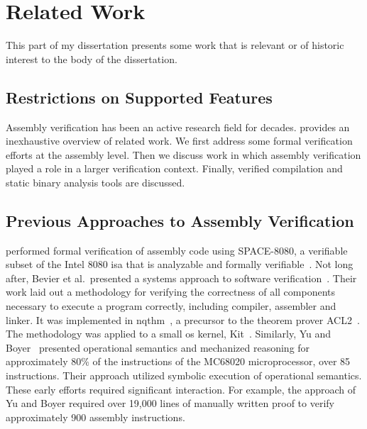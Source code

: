 \chapter{Related Work}
This part of my dissertation presents some work that is relevant
or of historic interest to the body of the dissertation.

\section{Restrictions on Supported Features}

Assembly verification has been an active research field for decades.
 provides an inexhaustive overview of related work.
We first address some formal verification efforts at the assembly level.
Then we discuss work in which assembly verification played a role in a larger verification context. 
Finally, verified compilation and static binary analysis tools are discussed.

\section{Previous Approaches to Assembly Verification}
\citet{clutterbuck1988verification} performed formal verification
of assembly code using SPACE-8080, a verifiable subset of the Intel 8080 \ac{isa} that is analyzable and formally verifiable~\citep{carre1986spade}.
Not long after, Bevier et al.\ presented a systems approach
to software verification~\citep{bevier1989approach,boyer1979computational}.
Their work laid out a methodology for verifying the correctness
of all components necessary to execute a program correctly, including compiler, assembler and linker.
It was implemented in \ac{nqthm}~\citep{boyer1979computational},
a precursor to the theorem prover ACL2~\citep{ACL2}.
The methodology was applied to a small \ac{os} kernel, Kit~\citep{bevier1989kit}.
Similarly, Yu and Boyer~\citep{yu1992automated,boyer1996automated}
presented operational semantics and mechanized reasoning
for approximately 80\% of the instructions of the MC68020 microprocessor,
over 85 instructions.
Their approach utilized symbolic execution of operational semantics.
These early efforts required significant interaction.
For example, the approach of Yu and Boyer required over 19,000 lines of manually written proof to verify approximately 900 assembly instructions.

